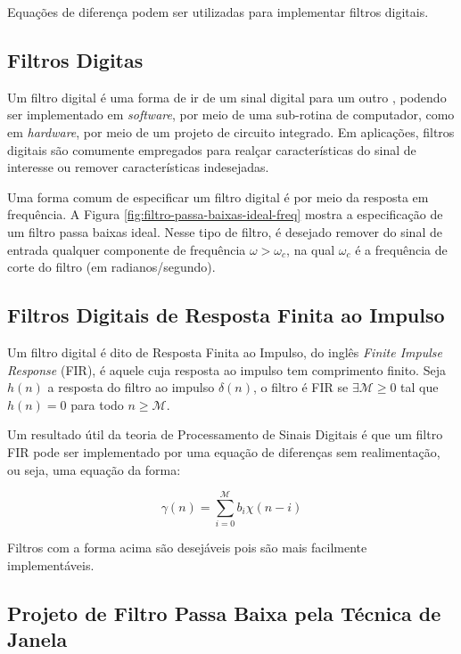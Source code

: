 {Equações de diferença podem ser utilizadas para implementar filtros digitais.

\subsection{Filtros Digitas}

Um filtro digital é uma forma de ir de um sinal digital para um outro
\cite{classnote-on-intro-to-digital-filters}, podendo ser implementado em
\textit{software}, por meio de uma sub-rotina de computador, como em
\textit{hardware}, por meio de um projeto de circuito integrado. Em aplicações,
filtros digitais são comumente empregados para realçar características do sinal
de interesse ou remover características indesejadas.

Uma forma comum de especificar um filtro digital é por meio da resposta em
frequência. A Figura \ref{fig:filtro-passa-baixas-ideal-freq} mostra a
especificação de um filtro passa baixas ideal. Nesse tipo de filtro, é desejado
remover do sinal de entrada qualquer componente de frequência $\omega >
\omega_c$, na qual $\omega_c$ é a frequência de corte do filtro (em
radianos/segundo).

\subsection{Filtros Digitais de Resposta Finita ao Impulso}

Um filtro digital é dito de 
Resposta Finita ao Impulso, do inglês \textit{Finite Impulse Response} (FIR), é
aquele cuja resposta ao impulso tem comprimento finito. Seja $h(n)$ a resposta
do filtro ao impulso $\delta(n)$, o filtro é FIR se $\exists \mathcal{M} \geq 0$
tal que $h(n) = 0$ para todo $n \geq \mathcal{M}$.

Um resultado útil da teoria de Processamento de Sinais Digitais é que um filtro
FIR pode ser implementado por uma equação de diferenças sem realimentação, ou
seja, uma equação da forma:

\begin{equation}
    \gamma(n) = 	\sum_{i=0}^{\mathcal{M}} b_i \chi(n-i)
\end{equation}

Filtros com a forma acima são desejáveis pois são mais facilmente
implementáveis.

\subsection{Projeto de Filtro Passa Baixa pela Técnica de Janela}

}

